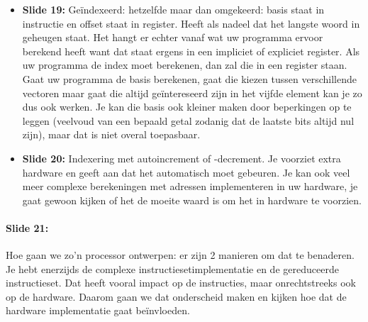\documentclass[10pt,a4paper]{book}
\begin{document}
\begin{itemize}
\item \textbf{Slide 19:} Ge\"indexeerd: hetzelfde maar dan omgekeerd: basis staat in instructie en offset staat in register. Heeft als nadeel dat het langste woord in geheugen staat. Het hangt er echter vanaf wat uw programma ervoor berekend heeft want dat staat ergens in een impliciet of expliciet register. Als uw programma de index moet berekenen, dan zal die in een register staan. Gaat uw programma de basis berekenen, gaat die kiezen tussen verschillende vectoren maar gaat die altijd ge\"intereseerd zijn in het vijfde element kan je zo dus ook werken. Je kan die basis ook kleiner maken door beperkingen op te leggen (veelvoud van een bepaald getal zodanig dat de laatste bits altijd nul zijn), maar dat is niet overal toepasbaar.
\item \textbf{Slide 20:} Indexering met autoincrement of -decrement. Je voorziet extra hardware en geeft aan dat het automatisch moet gebeuren. Je kan ook veel meer complexe berekeningen met adressen implementeren in uw hardware, je gaat gewoon kijken of het de moeite waard is om het in hardware te voorzien.
\end{itemize}

\paragraph{Slide 21:} Hoe gaan we zo'n processor ontwerpen: er zijn 2 manieren om dat te benaderen. Je hebt enerzijds de complexe instructiesetimplementatie en de gereduceerde instructieset. Dat heeft vooral impact op de instructies, maar onrechtstreeks ook op de hardware. Daarom gaan we dat onderscheid maken en kijken hoe dat de hardware implementatie gaat be\"invloeden.
\end{document}
